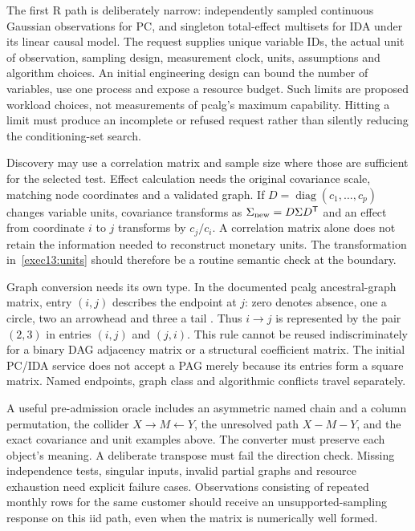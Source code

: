 The first R path is deliberately narrow: independently sampled continuous
Gaussian observations for PC, and singleton total-effect multisets for IDA
under its linear causal model. The request supplies unique variable IDs,
the actual unit of observation, sampling design, measurement clock, units,
assumptions and algorithm choices. An initial engineering design can bound
the number of variables, use one process and expose a resource budget.
Such limits are proposed workload choices, not measurements of pcalg's
maximum capability. Hitting a limit must produce an incomplete or refused
request rather than silently reducing the conditioning-set search.

Discovery may use a correlation matrix and sample size where those are
sufficient for the selected test. Effect calculation needs the original
covariance scale, matching node coordinates and a validated graph. If
$D=\operatorname{diag}(c_1,\ldots,c_p)$ changes variable units, covariance
transforms as $\Sigma_{\rm new}=D\Sigma D^{\mathsf T}$ and an effect from
coordinate $i$ to $j$ transforms by $c_j/c_i$. A correlation matrix alone
does not retain the information needed to reconstruct monetary units.
The transformation in~\eqref{exec13:units} should therefore be a routine
semantic check at the boundary.

Graph conversion needs its own type. In the documented pcalg ancestral-graph
matrix, entry $(i,j)$ describes the endpoint at $j$: zero denotes absence,
one a circle, two an arrowhead and three a tail \citep{exec13_pcalg}.
Thus $i\rightarrow j$ is represented by the pair $(2,3)$ in entries
$(i,j)$ and $(j,i)$. This rule cannot be reused indiscriminately for a binary
DAG adjacency matrix or a structural coefficient matrix. The initial PC/IDA
service does not accept a PAG merely because its entries form a square matrix.
Named endpoints, graph class and algorithmic conflicts travel separately.

A useful pre-admission oracle includes an asymmetric named chain and a column
permutation, the collider $X\rightarrow M\leftarrow Y$, the unresolved path
$X-M-Y$, and the exact covariance and unit examples above. The converter
must preserve each object's meaning. A deliberate transpose must fail the
direction check. Missing independence tests, singular inputs, invalid partial
graphs and resource exhaustion need explicit failure cases. Observations
consisting of repeated monthly rows for the same customer should receive an
unsupported-sampling response on this iid path, even when the matrix is
numerically well formed.

